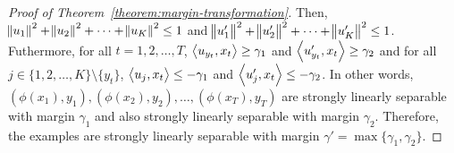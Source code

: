 \begin{proof}[Proof of Theorem~\ref{theorem:margin-transformation}]
Then, $\norm{u_1}^2 + \norm{u_2}^2 + \dots + \norm{u_K}^2 \le 1$ and
$\norm{u_1'}^2 + \norm{u_2'}^2 + \dots + \norm{u_K'}^2 \le 1$.
Futhermore, for all $t=1,2,\dots,T$, $\left\langle u_{y_t}, x_t \right\rangle \ge \gamma_1$ and
$\left\langle u'_{y_t}, x_t \right\rangle \ge \gamma_2$
and for all $j \in \{1,2,\dots,K\} \setminus \{y_t\}$,
$\left\langle u_j, x_t \right\rangle \le - \gamma_1$ and $\left\langle u'_j, x_t \right\rangle \le - \gamma_2$. In other words,
$(\phi(x_1), y_1), (\phi(x_2), y_2), \dots, (\phi(x_T), y_T)$ are
strongly linearly separable with margin $\gamma_1$ and also strongly linearly
separable with margin $\gamma_2$. Therefore, the examples are strongly
linearly separable with margin $\gamma' = \max\{\gamma_1, \gamma_2\}$.
\end{proof}
